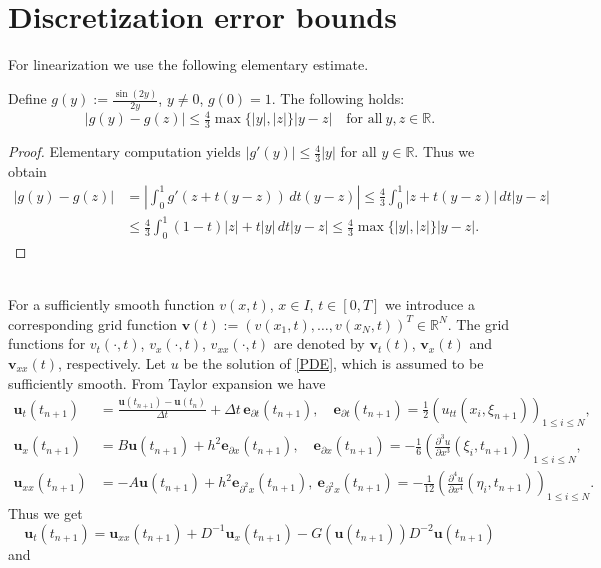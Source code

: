 \documentclass{siamltex}
\newcommand{\R}{\mathbb{R}}
\newcommand{\be}{\mathbf e}
\newcommand{\bu}{\mathbf u}
\newcommand{\bv}{\mathbf v}
\begin{document}
{\section{Discretization error bounds} \label{Secdiscrerror}
For linearization we use the following elementary estimate.
\begin{lemma} \label{lemma8}
 Define $g(y):=\frac{\sin(2y)}{2y}$, $y \neq 0$, $g(0)=1$. The following holds:
 \[ 
  |g(y) - g(z)| \leq \tfrac43 \max \{|y|,|z|\} |y-z| \quad \text{for all}~ y,z \in \R.
 \]
\end{lemma}
\begin{proof}
Elementary computation yields $|g'(y)| \leq \tfrac43 |y|$ for all $y \in \R$. Thus we obtain
\[ \begin{split}
 |g(y) - g(z)| & = \left| \int_0^1 g'(z+t(y-z)) \, dt (y-z)\right| \leq \tfrac43 \int_0^1 |z+t(y-z)| \, dt |y-z| \\
  & \leq \tfrac43 \int_0^1 (1-t)|z|+ t|y| \, dt |y-z| \leq \tfrac43 \max \{|y|,|z|\} |y-z|.
\end{split} \]
\end{proof}
\ \\[1ex]
For a sufficiently smooth function $v(x,t)$, $x \in I$, $t \in [0,T]$ we introduce a corresponding grid function $\bv(t):=\left(v(x_1,t),\ldots, v(x_N,t)\right)^T \in \R^N$. The grid functions for $v_t(\cdot,t)$, $v_x(\cdot,t)$, $v_{xx}(\cdot,t)$ are denoted by $\bv_t(t)$, $\bv_x(t)$ and $\bv_{xx}(t)$, respectively. Let $u$ be the solution of \eqref{PDE}, which is assumed to be sufficiently smooth. From Taylor expansion we have 
\begin{align*}
 \bu_t(t_{n+1}) & = \frac{\bu(t_{n+1}) - \bu(t_n)}{\Delta t} + \Delta t  \, \be_{\partial t}(t_{n+1}), \quad  \be_{\partial t}(t_{n+1})=\tfrac12 \left(u_{tt}(x_i,\xi_{n+1})\right)_{1 \leq i \leq N}, \\
 \bu_{x}(t_{n+1}) & = B \bu(t_{n+1}) + h^2 \be_{\partial x}(t_{n+1}), \quad \be_{\partial x}(t_{n+1})= - \tfrac16 \left( \frac{\partial^3 u}{\partial x^3}(\xi_i,t_{n+1})\right)_{1 \leq i \leq N}, \\
 \bu_{xx}(t_{n+1}) &= -A \bu(t_{n+1}) + h^2 \be_{\partial^2 x}(t_{n+1}), ~\be_{\partial^2 x}(t_{n+1})= -\tfrac{1}{12}\left(\frac{\partial^4 u}{\partial x^4}(\eta_i,t_{n+1})\right)_{1 \leq i \leq N}.
\end{align*}
Thus we get  
\[
  \bu_t(t_{n+1}) = \bu_{xx}(t_{n+1}) + D^{-1}\bu_{x}(t_{n+1}) - G(\bu(t_{n+1}))D^{-2}\bu(t_{n+1})
\]
and  
\begin{equation} \label{erreq1} \begin{split}

\end{split}
\end{equation}}
\end{document}
